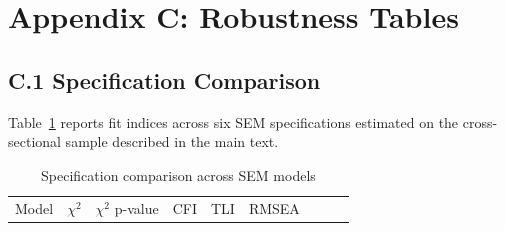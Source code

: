 \documentclass[
  number]{elsarticle}
\begin{document}
\newpage

\section*{Appendix C: Robustness
Tables}\label{appendix-c-robustness-tables}

\subsection{C.1 Specification
Comparison}\label{c.1-specification-comparison}

Table~\ref{tbl-spec-comparison} reports fit indices across six SEM
specifications estimated on the cross-sectional sample described in the
main text.

\begin{longtable}[]{@{}
  >{\raggedright\arraybackslash}p{}
  >{\raggedleft\arraybackslash}p{}
  >{\raggedleft\arraybackslash}p{}
  >{\raggedleft\arraybackslash}p{}
  >{\raggedleft\arraybackslash}p{}
  >{\raggedleft\arraybackslash}p{}
  >{\raggedleft\arraybackslash}p{}
  >{\raggedleft\arraybackslash}p{}
  >{\raggedleft\arraybackslash}p{}@{}}
\caption{Specification comparison across SEM
models}\label{tbl-spec-comparison}\tabularnewline
\toprule\noalign{}
\begin{minipage}[b]{\linewidth}\raggedright
Model
\end{minipage} & \begin{minipage}[b]{\linewidth}\raggedleft
\(\chi^2\)
\end{minipage} & \begin{minipage}[b]{\linewidth}\raggedleft
\(\chi^2\) p-value
\end{minipage} & \begin{minipage}[b]{\linewidth}\raggedleft
CFI
\end{minipage} & \begin{minipage}[b]{\linewidth}\raggedleft
TLI
\end{minipage} & \begin{minipage}[b]{\linewidth}\raggedleft
RMSEA
\end{minipage} & \begin{minipage}[b]{\linewidth}\raggedleft

\end{minipage}
\end{longtable}
\end{document}
